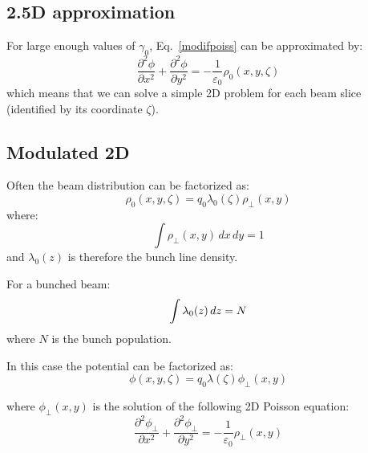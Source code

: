 \subsection{2.5D approximation}
For large enough values of $\gamma_0$, Eq.~\ref{modifpoiss} can be approximated by:
\begin{equation}
\boxed{
\frac{\partial^2 \phi}{\partial x^2} +  \frac{\partial^2 \phi}{\partial y^2} = -\frac{1}{\varepsilon_0}{\rho}_0 \left(x, y,\zeta\right) }\label{2dpoiss}
\end{equation}
which means that we can solve a simple 2D problem for each beam slice (identified by its coordinate $\zeta$).


\subsection{Modulated 2D}
\label{sec:modulated2d}

Often the beam distribution can be factorized as:
\begin{equation}
\rho_0(x,y,\zeta) = q_0\lambda_0(\zeta)\rho_\perp(x,y) 
\end{equation}
where:
\begin{equation}
\int \rho_\perp(x,y) \,dx\,dy = 1
\end{equation}
and $\lambda_0(z)$ is therefore the bunch line density.

For a bunched beam:
\begin{equation}
\int \lambda_0(z) \,dz = N \label{eq:lamnorm}\\
\end{equation}
where $N$ is the bunch population.

In this case the potential can be factorized as:
\begin{equation}
\phi(x,y,\zeta) = q_0\lambda(\zeta)\phi_\perp(x,y) 
\label{eq:factorized2d}
\end{equation}

where $\phi_\perp(x,y)$ is the solution of the following 2D Poisson equation:
\begin{equation}
\frac{\partial^2 \phi_\perp}{\partial x^2} +  \frac{\partial^2 \phi_\perp}{\partial y^2} = -\frac{1}{\varepsilon_0}{\rho}_\perp \left(x, y\right) \label{2dpoisspeerp}
\end{equation}


